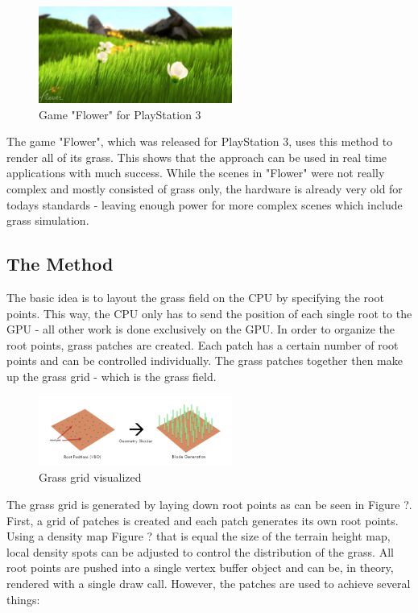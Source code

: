 \documentclass[conference]{acmsiggraph}
\begin{document}
 \begin{figure}[ht]
   \centering
   \includegraphics[width=2.5in]{images/flower_game}
   \caption{Game "Flower" for PlayStation 3}
 \end{figure}    
 
The game "Flower", which was released for PlayStation 3, uses this method to render all of its grass. This shows that the approach can be used in real time applications with much success. While the scenes in "Flower" were not really complex and mostly consisted of grass only, the hardware is already very old for todays standards - leaving enough power for more complex scenes which include grass simulation.

\subsection{The Method}
The basic idea is to layout the grass field on the CPU by specifying the root points. This way, the CPU only has to send the position of each single root to the GPU - all other work is done exclusively on the GPU. In order to organize the root points, grass patches are created. Each patch has a certain number of root points and can be controlled individually. The grass patches together then 
make up the grass grid - which is the grass field.

 \begin{figure}[ht]
   \centering
   \includegraphics[width=2.5in]{images/grass_grid}
   \caption{Grass grid visualized}
 \end{figure}

The grass grid is generated by laying down root points as can be seen in Figure {?}. First, a grid of patches is created and each patch generates its own root points. Using a density map {Figure ?} that is equal the size of the terrain height map, local density spots can be adjusted to control the distribution of the grass. All root points are pushed into a single vertex buffer object and can be, in theory, rendered with a single draw call. However, the patches are used to achieve several things:
\end{document}
